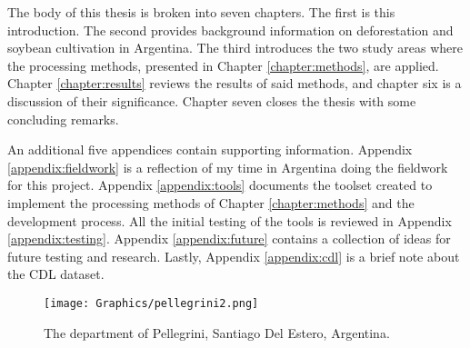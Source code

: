 The body of this thesis is broken into seven chapters. The first is this introduction. The second provides background information on deforestation and soybean cultivation in Argentina. The third introduces the two study areas where the processing methods, presented in Chapter \ref{chapter:methods}, are applied. Chapter \ref{chapter:results} reviews the results of said methods, and chapter six is a discussion of their significance. Chapter seven closes the thesis with some concluding remarks.

An additional five appendices contain supporting information. Appendix \ref{appendix:fieldwork} is a reflection of my time in Argentina doing the fieldwork for this project. Appendix \ref{appendix:tools} documents the toolset created to implement the processing methods of Chapter \ref{chapter:methods} and the development process. All the initial testing of the tools is reviewed in Appendix \ref{appendix:testing}. Appendix \ref{appendix:future} contains a collection of ideas for future testing and research. Lastly, Appendix \ref{appendix:cdl} is a brief note about the CDL dataset.

\begin{figure}
  \centering
  \texttt{[image: Graphics/pellegrini2.png]}
  \caption{The department of Pellegrini, Santiago Del Estero, Argentina.}
  \label{fig:pellegrini}
\end{figure}
